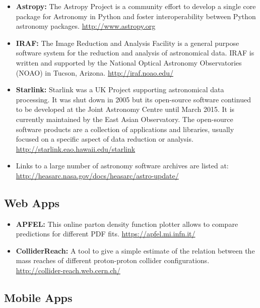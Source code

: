 \begin{itemize}
\item
  \textbf{Astropy:} The Astropy Project is a community effort to develop
  a single core package for Astronomy in Python and foster
  interoperability between Python astronomy packages.
  \url{http://www.astropy.org}
\item
  \textbf{IRAF:} The Image Reduction and Analysis Facility is a general
  purpose software system for the reduction and analysis of astronomical
  data. IRAF is written and supported by the National Optical Astronomy
  Observatories (NOAO) in Tucson, Arizona. \url{http://iraf.noao.edu/}
\item
  \textbf{Starlink:} Starlink was a UK Project supporting astronomical
  data processing. It was shut down in 2005 but its open-source software
  continued to be developed at the Joint Astronomy Centre until March
  2015. It is currently maintained by the East Asian Observatory. The
  open-source software products are a collection of applications and
  libraries, usually focused on a specific aspect of data reduction or
  analysis. \url{http://starlink.eao.hawaii.edu/starlink}
\item
  Links to a large number of astronomy software archives are listed at:
  \url{http://heasarc.nasa.gov/docs/heasarc/astro-update/}
\end{itemize}

\subsection{Web Apps}\label{web-apps}

\begin{itemize}
\item
  \textbf{APFEL:} This online parton density function plotter allows to
  compare predictions for different PDF fits.
  \url{https://apfel.mi.infn.it/}
\item
  \textbf{ColliderReach:} A tool to give a simple estimate of the
  relation between the mass reaches of different proton-proton collider
  configurations. \url{http://collider-reach.web.cern.ch/}
\end{itemize}

\subsection{Mobile Apps}\label{mobile-apps}

